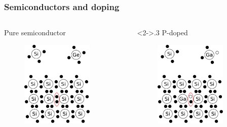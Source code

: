 \documentclass[beamer]{standalone}
\begin{document}
\begin{frame}
\frametitle{Semiconductors and doping}
 \begin{columns}[t]
  \begin{column}{.3\textwidth}
    Pure semiconductor
    \begin{figure}
      \includegraphics[width=0.80\textwidth]{./pics/semiconductor}
    \end{figure}
  \end{column}
  \begin{column}<2->{.3\textwidth}
    P-doped
    \begin{figure}
      \includegraphics[width=0.80\textwidth]{./pics/pdopped}

\end{figure}
\end{column}
\end{columns}
\end{frame}
\end{document}
